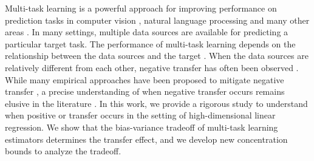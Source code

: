 Multi-task learning is a powerful approach for improving performance on prediction tasks in computer vision \cite{chexnet17,ZSSGM18}, natural language processing \cite{GLUE,superglue} and many other areas \cite{ZY17}.
In many settings, multiple data sources are available for predicting a particular target task.
The performance of multi-task learning depends on the relationship between the data sources and the target \cite{C97}.
When the data sources are relatively different from each other, negative transfer has often been observed \cite{PY09,AP16,BS17}.
While many empirical approaches have been proposed to mitigate negative transfer \cite{ZY17}, a precise understanding of when negative transfer occurs remains elusive in the literature \cite{R17}.
In this work, we provide a rigorous study to understand when positive or transfer occurs in the setting of high-dimensional linear regression.
We show that the bias-variance tradeoff of multi-task learning estimators determines the transfer effect, and we develop new concentration bounds to analyze the tradeoff.


